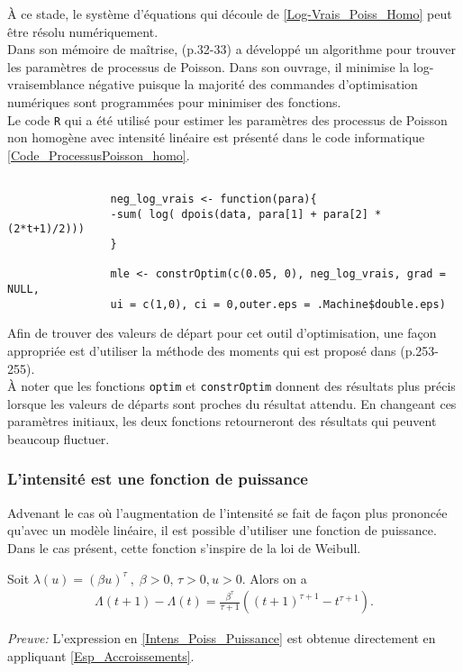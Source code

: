 			À ce stade, le système d'équations qui découle de \ref{Log-Vrais_Poiss_Homo} peut être résolu numériquement.\\
			
			Dans son mémoire de maîtrise, \cite{Drazek_PoissProcess2013}(p.32-33) a développé un algorithme pour trouver les paramètres de processus de Poisson. Dans son ouvrage, il minimise la log-vraisemblance négative puisque la majorité des commandes d'optimisation numériques sont programmées pour minimiser des fonctions. \\
			
			Le code \texttt{R} qui a été utilisé pour estimer les paramètres des processus de Poisson non homogène avec intensité linéaire est présenté dans le code informatique \ref{Code_ProcessusPoisson_homo}.
			\begin{Code} \label{Code_ProcessusPoisson_homo}
				\begin{verbatim} 
				
				neg_log_vrais <- function(para){
				-sum( log( dpois(data, para[1] + para[2] * (2*t+1)/2)))
				}
				
				mle <- constrOptim(c(0.05, 0), neg_log_vrais, grad = NULL, 
				ui = c(1,0), ci = 0,outer.eps = .Machine$double.eps)
				\end{verbatim}
			\end{Code}
			Afin de trouver des valeurs de départ pour cet outil d'optimisation, une façon appropriée est d'utiliser la méthode des moments qui est proposé dans \cite{LossModels_Klugman2012}(p.253-255).\\
			
			À noter que les fonctions \texttt{optim} et \texttt{constrOptim} donnent des résultats plus précis lorsque les valeurs de départs sont proches du résultat attendu.
			En changeant ces paramètres initiaux, les deux fonctions retourneront des résultats qui peuvent beaucoup fluctuer.
					
		\subsubsection{L'intensité est une fonction de puissance}
			Advenant le cas où l'augmentation de l'intensité se fait de façon plus prononcée qu'avec un modèle linéaire, il est possible d'utiliser une fonction de puissance. Dans le cas présent, cette fonction s'inspire de la loi de Weibull.
			
			\begin{Proposition}
				Soit $\lambda(u) = (\beta u)^\tau \ , \; \beta>0,\,\tau>0, u>0.$ Alors on a 
				\begin{align}
				\Lambda(t+1) - \Lambda(t) = \frac{\beta^\tau}{\tau+1}((t+1)^{\tau+1}-t^{\tau+1}) \label{Intens_Poiss_Puissance}.
				\end{align}
			\end{Proposition}
			\textit{Preuve:} L'expression en \ref{Intens_Poiss_Puissance} est obtenue directement en appliquant \ref{Esp_Accroissements}.\\
			
